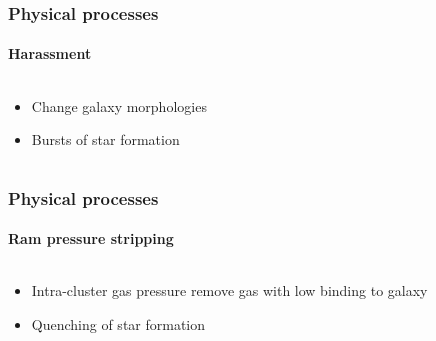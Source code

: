 \begin{frame}
    \frametitle{Physical processes}
    \framesubtitle{Harassment}
    \begin{columns}
        \begin{column}{0.5\textwidth}
            \begin{block}{}
                \begin{itemize}
                    \item Change galaxy morphologies
                    \item Bursts of star formation
                \end{itemize}
            \end{block}
        \end{column}
        \begin{column}{0.5\textwidth}
        \end{column}
    \end{columns}
\end{frame}

\begin{frame}
    \frametitle{Physical processes}
    \framesubtitle{Ram pressure stripping}
    \begin{columns}
        \begin{column}{0.5\textwidth}
            \begin{block}{}
                \begin{itemize}
                    \item Intra-cluster gas pressure remove gas with low
                        binding to galaxy
                    \item Quenching of star formation
                \end{itemize}
            \end{block}
        \end{column}
        \begin{column}{0.5\textwidth}
        \end{column}
    \end{columns}
\end{frame}

